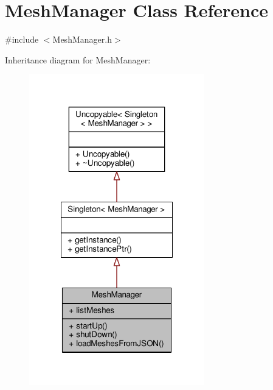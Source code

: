 \hypertarget{classMeshManager}{\section{Mesh\-Manager Class Reference}
\label{classMeshManager}
}


{\ttfamily \#include $<$Mesh\-Manager.\-h$>$}



Inheritance diagram for Mesh\-Manager\-:
\nopagebreak
\begin{figure}[H]
\begin{center}
\leavevmode
\includegraphics[width=216pt]{classMeshManager__inherit__graph}
\end{center}
\end{figure}


